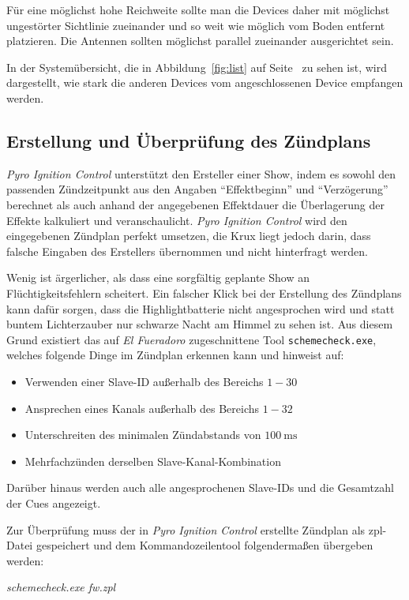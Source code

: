 \documentclass[paper=a4, parskip, numbers=noenddot, toc=listof, headsepline]{scrbook}
\newcommand{\pic}{\emph{Pyro Ignition Control}}
\newcommand{\anlage}{\emph{El Fueradoro}}
\begin{document}
				Für eine möglichst hohe Reichweite sollte man die Devices daher mit möglichst ungestörter Sichtlinie zueinander und so weit wie möglich vom Boden entfernt platzieren. Die Antennen sollten möglichst parallel zueinander ausgerichtet sein.

				In der Systemübersicht, die in Abbildung~\ref{fig:list} auf Seite~\pageref{fig:list} zu sehen ist, wird dargestellt, wie stark die anderen Devices vom angeschlossenen Device empfangen werden.

			\subsection{Erstellung und Überprüfung des Zündplans}

					{\pic} unterstützt den Ersteller einer Show, indem es sowohl den passenden Zündzeitpunkt aus den Angaben \enquote{Effektbeginn} und \enquote{Verzögerung} berechnet als auch anhand der angegebenen Effektdauer die Überlagerung der Effekte kalkuliert und veranschaulicht.
				\pic{} wird den eingegebenen Zündplan perfekt umsetzen, die Krux liegt jedoch darin, dass falsche Eingaben des Erstellers übernommen und nicht hinterfragt werden.

				Wenig ist ärgerlicher, als dass eine sorgfältig geplante Show an Flüchtigkeitsfehlern scheitert. Ein falscher Klick bei der Erstellung des Zündplans kann dafür sorgen, dass die Highlightbatterie nicht angesprochen wird und statt buntem Lichterzauber nur schwarze Nacht am Himmel zu sehen ist. Aus diesem Grund existiert das auf {\anlage} zugeschnittene Tool \texttt{schemecheck.exe}, welches folgende Dinge im Zündplan erkennen kann und hinweist auf:
				\begin{itemize}
					\item
					      Verwenden einer Slave-ID außerhalb des Bereichs $1-30$
					\item
					      Ansprechen eines Kanals außerhalb des Bereichs $1-32$
					\item
					      Unterschreiten des minimalen Zündabstands von $\SI{100}{\milli\second}$
					\item
					      Mehrfachzünden derselben Slave-Kanal-Kombination
				\end{itemize}
				Darüber hinaus werden auch alle angesprochenen Slave-IDs und die Gesamtzahl der Cues angezeigt.

				Zur Überprüfung muss der in {\pic} erstellte Zündplan als zpl-Datei gespeichert und dem Kommandozeilentool folgendermaßen übergeben werden:
				\begin{center}
					\emph{schemecheck.exe fw.zpl}
				\end{center}
\end{document}
